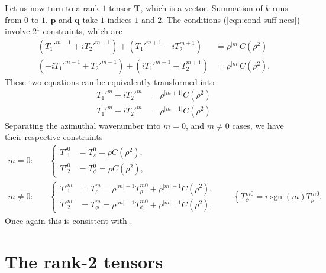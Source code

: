 \documentclass[a4paper, 11pt]{article}
\DeclareMathOperator{\sgn}{sgn}
\begin{document}
Let us now turn to a rank-$1$ tensor $\mathbf{T}$, which is a vector. Summation of $k$ runs from $0$ to $1$. $\mathbf{p}$ and $\mathbf{q}$ take $1$-indices $1$ and $2$. The conditions (\ref{eqn:cond-suff-necs}) involve $2^1$ constraints, which are
\begin{equation}
\begin{aligned}
    \left(T_1'^{m-1} + i T_2'^{m-1}\right) + \left(T_1'^{m+1} - i T_2^{m+1}\right) &= \rho^{|m|}C(\rho^2) \\ 
    \left(-iT_1'^{m-1} + T_2'^{m-1}\right) + \left(iT_1'^{m+1} + T_2^{m+1}\right) &= \rho^{|m|}C(\rho^2).
\end{aligned}
\end{equation}
These two equations can be equivalently transformed into
\[
\begin{aligned}
    T_1'^m + i T_2'^m &= \rho^{|m + 1|} C(\rho^2) \\ 
    T_1'^m - i T_2'^m &= \rho^{|m - 1|} C(\rho^2)
\end{aligned}
\]
Separating the azimuthal wavenumber into $m=0$, and $m\neq 0$ cases, we have their respective constraints
\begin{equation}
\begin{aligned}
    m=0:& \quad 
    \left\{\begin{aligned}
        T'^0_1 &= T^0_s = \rho C(\rho^2),\\
        T'^0_2 &= T^0_\phi = \rho C(\rho^2),
    \end{aligned}\right. \\
    m\neq 0:& \quad 
    \left\{\begin{aligned}
        T'^m_1 &= T^m_\rho = \rho^{|m|-1} T^{m0}_\rho + \rho^{|m|+1} C(\rho^2), \\ 
        T'^m_2 &= T^m_\phi = \rho^{|m|-1} T^{m0}_\phi + \rho^{|m|+1} C(\rho^2),
    \end{aligned}\right. \qquad \left\{T^{m0}_\phi = i\sgn(m) T^{m0}_\rho. \right.
\end{aligned}
\end{equation}
Once again this is consistent with \textcite{lewis_physical_1990}.


\section{The rank-2 tensors}
\end{document}
